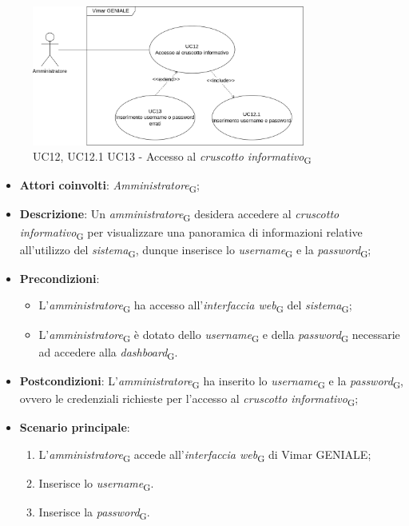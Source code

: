 \begin{figure}[H]
\centering
\includegraphics[width=0.8\textwidth]{contents/casi_duso/png/UC12.png}
\caption{UC12, UC12.1 UC13 - Accesso al \textit{cruscotto informativo}\textsubscript{G} }
\end{figure}

\begin{itemize}
    \item \textbf{Attori coinvolti}: \textit{Amministratore}\textsubscript{G};
    \item \textbf{Descrizione}: Un \textit{amministratore}\textsubscript{G} desidera accedere al \textit{cruscotto informativo}\textsubscript{G} per visualizzare una panoramica di informazioni relative all’utilizzo del \textit{sistema}\textsubscript{G}, dunque inserisce lo \textit{username}\textsubscript{G} e la \textit{password}\textsubscript{G};
    \item \textbf{Precondizioni}: 
        \begin{itemize}
            \item L’\textit{amministratore}\textsubscript{G} ha accesso all’\textit{interfaccia web}\textsubscript{G} del \textit{sistema}\textsubscript{G};
            \item L’\textit{amministratore}\textsubscript{G} è dotato dello \textit{username}\textsubscript{G} e della \textit{password}\textsubscript{G} necessarie ad accedere alla \textit{dashboard}\textsubscript{G}.
        \end{itemize}
    \item \textbf{Postcondizioni}: L’\textit{amministratore}\textsubscript{G} ha inserito lo \textit{username}\textsubscript{G} e la \textit{password}\textsubscript{G}, ovvero le credenziali richieste per l’accesso al \textit{cruscotto informativo}\textsubscript{G};
    \item \textbf{Scenario principale}:
    \begin{enumerate}
    \item L’\textit{amministratore}\textsubscript{G} accede all’\textit{interfaccia web}\textsubscript{G} di Vimar GENIALE;
    \item Inserisce lo \textit{username}\textsubscript{G}.
    \item Inserisce la \textit{password}\textsubscript{G}.
    \end{enumerate}
\end{itemize}


